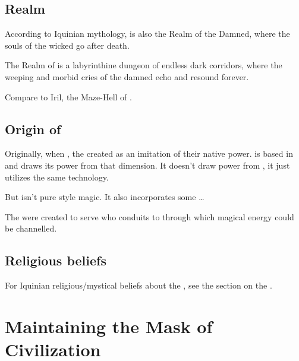 \subsection{Realm}
According to Iquinian mythology, \Itzach{} is also the Realm of the Damned, where the souls of the wicked go after death. 

The Realm of \Itzach{} is a labyrinthine dungeon of endless dark corridors, where the weeping and morbid cries of the damned echo and resound forever. 

Compare to Iril, the Maze-Hell of . 








\subsection{Origin of \Itzach}
Originally, when ,
the \banes{} created \nieur{} as an imitation of their native \erebean{} power. \Nieur{} is based in \Nyx{} and draws its power from that dimension. It doesn't draw power from \Erebos, it just utilizes the same technology. 

But \nieur{} isn't pure \Erebean{} style magic. 
It also incorporates some \ldots{}

The \qliphoth were created to serve who conduits to \Erebos{} through which magical energy could be channelled. 









\subsection{Religious beliefs}
For Iquinian religious/mystical beliefs about the \qliphoth, see the section on the . 













\section{Maintaining the Mask of Civilization}

